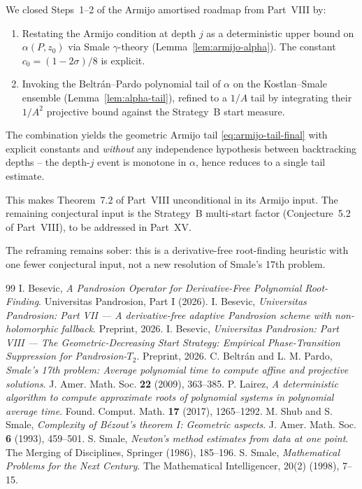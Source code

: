 \documentclass[11pt,a4paper]{article}
\begin{document}
We closed Steps~1--2 of the Armijo amortised roadmap from Part~VIII by:
\begin{enumerate}
\item Restating the Armijo condition at depth $j$ as a deterministic upper bound on $\alpha(P, z_0)$ via Smale $\gamma$-theory (Lemma~\ref{lem:armijo-alpha}). The constant $c_0 = (1 - 2\sigma)/8$ is explicit.
\item Invoking the Beltr\'an--Pardo polynomial tail of $\alpha$ on the Kostlan--Smale ensemble (Lemma~\ref{lem:alpha-tail}), refined to a $1/A$ tail by integrating their $1/A^2$ projective bound against the Strategy~B start measure.
\end{enumerate}
The combination yields the geometric Armijo tail \eqref{eq:armijo-tail-final} with explicit constants and \emph{without} any independence hypothesis between backtracking depths -- the depth-$j$ event is monotone in $\alpha$, hence reduces to a single tail estimate.

This makes Theorem~7.2 of Part~VIII unconditional in its Armijo input. The remaining conjectural input is the Strategy~B multi-start factor (Conjecture~5.2 of Part~VIII), to be addressed in Part~XV.

The reframing remains sober: this is a derivative-free root-finding heuristic with one fewer conjectural input, not a new resolution of Smale's 17th problem.

\begin{thebibliography}{99}
 I. Besevic, \textit{A Pandrosion Operator for Derivative-Free Polynomial Root-Finding}. Universitas Pandrosion, Part I (2026).
 I. Besevic, \textit{Universitas Pandrosion: Part VII --- A derivative-free adaptive Pandrosion scheme with non-holomorphic fallback}. Preprint, 2026.
 I. Besevic, \textit{Universitas Pandrosion: Part VIII --- The Geometric-Decreasing Start Strategy: Empirical Phase-Transition Suppression for Pandrosion-$T_2$}. Preprint, 2026.
 C. Beltr\'an and L. M. Pardo, \textit{Smale's 17th problem: Average polynomial time to compute affine and projective solutions}. J. Amer. Math. Soc. \textbf{22} (2009), 363--385.
 P. Lairez, \textit{A deterministic algorithm to compute approximate roots of polynomial systems in polynomial average time}. Found. Comput. Math. \textbf{17} (2017), 1265--1292.
 M. Shub and S. Smale, \textit{Complexity of B\'ezout's theorem I: Geometric aspects}. J. Amer. Math. Soc. \textbf{6} (1993), 459--501.
 S. Smale, \textit{Newton's method estimates from data at one point}. The Merging of Disciplines, Springer (1986), 185--196.
 S. Smale, \textit{Mathematical Problems for the Next Century}. The Mathematical Intelligencer, 20(2) (1998), 7--15.
\end{thebibliography}
\end{document}
